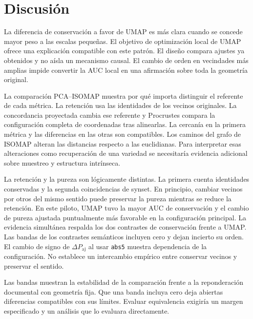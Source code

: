 \section{Discusión}
La diferencia de conservación a favor de UMAP es más clara cuando se concede mayor peso a las escalas pequeñas. El objetivo de optimización local de UMAP ofrece una explicación compatible con este patrón. El diseño compara ajustes ya obtenidos y no aísla un mecanismo causal. El cambio de orden en vecindades más amplias impide convertir la AUC local en una afirmación sobre toda la geometría original.

La comparación PCA--ISOMAP muestra por qué importa distinguir el referente de cada métrica. La retención usa las identidades de los vecinos originales. La concordancia proyectada cambia ese referente y Procrustes compara la configuración completa de coordenadas tras alinearlas. La cercanía en la primera métrica y las diferencias en las otras son compatibles. Los caminos del grafo de ISOMAP alteran las distancias respecto a las euclidianas. Para interpretar esas alteraciones como recuperación de una variedad se necesitaría evidencia adicional sobre muestreo y estructura intrínseca.

La retención y la pureza son lógicamente distintas. La primera cuenta identidades conservadas y la segunda coincidencias de synset. En principio, cambiar vecinos por otros del mismo sentido puede preservar la pureza mientras se reduce la retención. En este piloto, UMAP tuvo la mayor AUC de conservación y el cambio de pureza ajustada puntualmente más favorable en la configuración principal. La evidencia simultánea respalda los dos contrastes de conservación frente a UMAP. Las bandas de los contrastes semánticos incluyen cero y dejan incierto su orden. El cambio de signo de $\Delta P_{\mathrm{aj}}$ al usar \texttt{abs5} muestra dependencia de la configuración. No establece un intercambio empírico entre conservar vecinos y preservar el sentido.

Las bandas muestran la estabilidad de la comparación frente a la reponderación documental con geometría fija. Que una banda incluya cero deja abiertas diferencias compatibles con sus límites. Evaluar equivalencia exigiría un margen especificado y un análisis que lo evaluara directamente.
